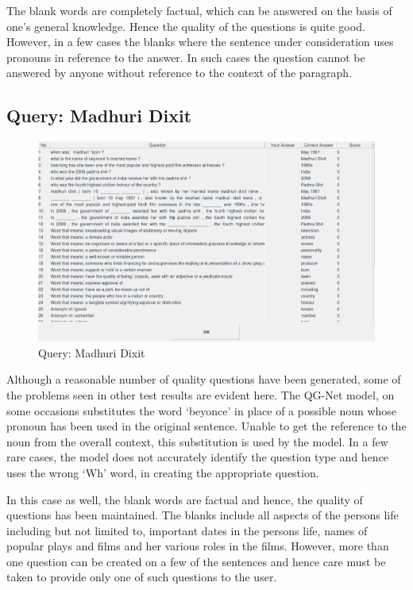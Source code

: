 The blank words are completely factual, which can be answered on the basis of
one’s general knowledge.  Hence the quality of the questions is quite good.
However, in a few cases the blanks where the sentence under consideration uses
pronouns in reference to the answer. In such cases the question cannot be
answered by anyone without reference to the context of the paragraph.

\subsection{Query: Madhuri Dixit}

\begin{figure}
	\caption{Query: Madhuri Dixit}
	\centering\includegraphics[width=12cm]{10.png}
\end{figure}

Although a reasonable number of quality questions have been generated, some of
the problems seen in other test results are evident here. The QG-Net model, on
some occasions substitutes the word ‘beyonce’ in place of a possible noun whose
pronoun has been used in the original sentence. Unable to get the reference to
the noun from the overall context, this substitution is used by the model. In a
few rare cases, the model does not accurately identify the question type and
hence uses the wrong ‘Wh’ word, in creating the appropriate question.


In this case as well, the blank words are factual and hence, the quality of
questions has been maintained.  The blanks include all aspects of the persons
life including but not limited to, important dates in the persons life, names of
popular plays and films and her various roles in the films. However, more than
one question can be created on a few of the sentences and hence care must be
taken to provide only one of such questions to the user.

